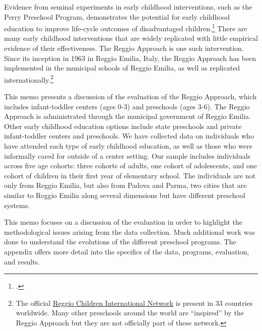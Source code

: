 Evidence from seminal experiments in early childhood interventions, such as the Perry Preschool Program, demonstrates the potential for early childhood education to improve life-cycle outcomes of disadvantaged children.\footnote{\citet{Heckman_Moon_etal_2010_QE, Elango_Hojman_etal_2016_Early-Edu}.} There are many early childhood interventions that are widely replicated with little empirical evidence of their effectiveness. The Reggio Approach is one such intervention. Since its inception in 1963 in Reggio Emilia, Italy, the Reggio Approach has been implemented in the municipal schools of Reggio Emilia, as well as replicated internationally.\footnote{The official \href{http://www.reggiochildren.it/network/?lang=en}{Reggio Children International Network} is present in 33 countries worldwide. Many other preschools around the world are ``inspired'' by the Reggio Approach but they are not officially part of these network.}

This memo presents a discussion of the evaluation of the Reggio Approach, which includes infant-toddler centers (ages 0-3) and preschools (ages 3-6). The Reggio Approach is administrated through the municipal government of Reggio Emilia. Other early childhood education options include state preschools and private infant-toddler centers and preschools. We have collected data on individuals who have attended each type of early childhood education, as well as those who were informally cared for outside of a center setting. Our sample includes individuals across five age cohorts: three cohorts of adults, one cohort of adolescents, and one cohort of children in their first year of elementary school. The individuals are not only from Reggio Emilia, but also from Padova and Parma, two cities that are similar to Reggio Emilia along several dimensions but have different preschool systems. 

This memo focuses on a discussion of the evaluation in order to highlight the methodological issues arising from the data collection. Much additional work was done to understand the evolutions of the different preschool programs. The appendix offers more detail into the specifics of the data, programs, evaluation, and results.

